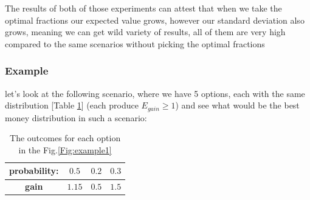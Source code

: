 \documentclass{article}
\begin{document}
	The results of both of those experiments can attest that when we take the optimal fractions our expected value grows, however our standard deviation also grows, meaning we can get wild variety of results, all of them are very high compared to the same scenarios without picking the optimal fractions
	\newpage
	
	
	
	
	\subsubsection{Example}
	let's look at the following scenario, where we have 5 options, each with the same distribution [Table \ref{prob}] (each produce $E_{gain} \ge 1$) and see what would be the best money distribution in such a scenario:\newline
	
	\begin{table}[!h]
		\centering\begin{tabular}{|c||c|c|c|}
			\hline
			\textbf{probability:} & $0.5$ & $0.2$ & $0.3$ \\ 
			\hline
			\textbf{gain} & $1.15$ & $0.5$ & $1.5$  \\
			\hline
		\end{tabular}
	\caption{The outcomes for each option in the Fig.\ref{Fig:example1}}
	\label{prob}
	\end{table}
	
\end{document}
